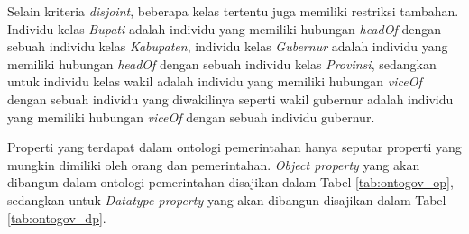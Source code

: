 Selain kriteria \emph{disjoint}, beberapa kelas tertentu juga memiliki restriksi tambahan. Individu kelas \emph{Bupati} adalah individu yang memiliki hubungan \emph{headOf} dengan sebuah individu kelas \emph{Kabupaten}, individu kelas \emph{Gubernur} adalah individu yang memiliki hubungan \emph{headOf} dengan sebuah individu kelas \emph{Provinsi}, sedangkan untuk individu kelas wakil adalah individu yang memiliki hubungan \emph{viceOf} dengan sebuah individu yang diwakilinya seperti wakil gubernur adalah individu yang memiliki hubungan \emph{viceOf} dengan sebuah individu gubernur.

Properti yang terdapat dalam ontologi pemerintahan hanya seputar properti yang mungkin dimiliki oleh orang dan pemerintahan. \emph{Object property} yang akan dibangun dalam ontologi pemerintahan disajikan dalam Tabel \ref{tab:ontogov_op}, sedangkan untuk \emph{Datatype property} yang akan dibangun disajikan dalam Tabel \ref{tab:ontogov_dp}.

